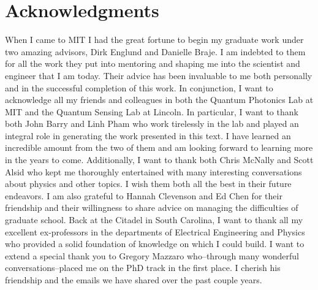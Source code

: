\cleardoublepage
\setcounter{savepage}{\thepage}
\begin{abstractpage}

\end{abstractpage}

% 

\cleardoublepage

\section*{Acknowledgments}

When I came to MIT I had the great fortune to begin my graduate work under two amazing advisors, Dirk Englund and Danielle Braje. I am indebted to them for all the work they put into mentoring and shaping me into the scientist and engineer that I am today. Their advice has been invaluable to me both personally and in the successful completion of this work. In conjunction, I want to acknowledge all my friends and colleagues in both the Quantum Photonics Lab at MIT and the Quantum Sensing Lab at Lincoln. In particular, I want to thank both John Barry and Linh Pham who work tirelessly in the lab and played an integral role in generating the work presented in this text. I have learned an incredible amount from the two of them and am looking forward to learning more in the years to come. Additionally, I want to thank both Chris McNally and Scott Alsid who kept me thoroughly entertained with many interesting conversations about physics and other topics. I wish them both all the best in their future endeavors. I am also grateful to Hannah Clevenson and Ed Chen for their friendship and their willingness to share advice on managing the difficulties of graduate school. Back at the Citadel in South Carolina, I want to thank all my excellent ex-professors in the departments of Electrical Engineering and Physics who provided a solid foundation of knowledge on which I could build. I want to extend a special thank you to Gregory Mazzaro who--through many wonderful conversations--placed me on the PhD track in the first place. I cherish his friendship and the emails we have shared over the past couple years. 


